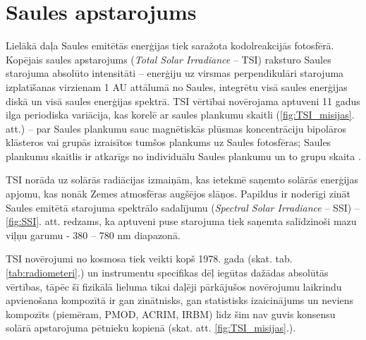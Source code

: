 \section{Saules apstarojums}

Lielākā daļa Saules emitētās enerģijas tiek saražota kodolreakcijās fotosfērā. 
Kopējais saules apstarojums (\textit{Total Solar Irradiance} -- TSI) raksturo Saules starojuma absolūto intensitāti -- enerģiju uz virsmas perpendikulāri starojuma izplatīšanas virzienam 1 AU attālumā no Saules, integrētu visā saules enerģijas diskā un visā saules enerģijas spektrā. TSI vērtībai novērojama aptuveni 11 gadus ilga periodiska variācija, kas korelē ar saules plankumu skaitli (\ref{fig:TSI_misijas}. att.) -- par Saules plankumu sauc magnētiskās plūsmas koncentrāciju bipolāros klāsteros vai grupās izraisītos tumšos plankums uz Saules fotosfēras; Saules plankumu skaitlis ir atkarīgs no individuālu Saules plankumu un to grupu skaita \cite{ThermalProcesses}.

TSI norāda uz solārās radiācijas izmaiņām, kas ietekmē saņemto solārās enerģijas apjomu, kas nonāk Zemes atmosfēras augšējos slāņos. Papildus ir noderīgi zināt Saules emitētā starojuma spektrālo sadalījumu (\textit{Spectral Solar Irradiance} -- SSI) -- \ref{fig:SSI}. att. redzams, ka aptuveni puse starojuma tiek saņemta salīdzinoši mazu viļņu garumu - 380 -- 780 nm diapazonā.

TSI novērojumi no kosmosa tiek veikti kopš 1978. gada (skat. tab. \ref{tab:radiometeri}.) un instrumentu specifikas dēļ iegūtas dažādas absolūtās vērtības, tāpēc šī fizikālā lieluma tikai daļēji pārkājušos novērojumu laikrindu apvienošana kompozītā ir gan zinātnisks, gan statistisks izaicinājums un neviens kompozīts (piemēram, PMOD, ACRIM, IRBM) līdz šim nav guvis konsensu solārā apstarojuma pētnieku kopienā (skat. att. \ref{fig:TSI_misijas}.).

